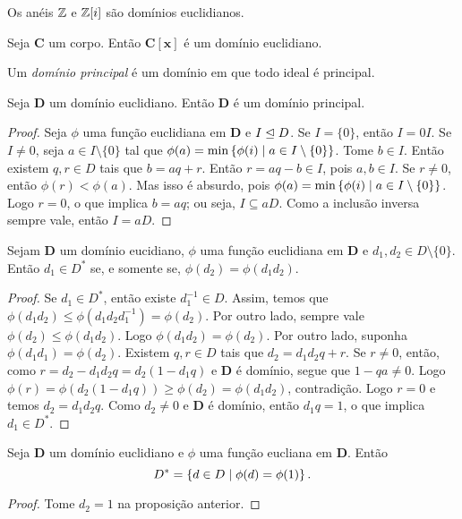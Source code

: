 \begin{prop}
Os anéis $\mathbb{Z}$ e $\mathbb{Z}[i]$ são domínios euclidianos.
\end{prop}

\begin{prop}
Seja $\bm C$ um corpo. Então $\bm{C[x]}$ é um domínio euclidiano.
\end{prop}

\begin{defi}
Um \emph{domínio principal} é um domínio em que todo ideal é principal.
\end{defi}

\begin{prop}
 Seja $\bm D$ um domínio euclidiano. Então $\bm D$ é um domínio principal.
\end{prop}
\begin{proof}
Seja $\phi$ uma função euclidiana em $\bm D$ e $I \mathrel{\unlhd} D$. Se $I = \{0\}$, então $I = 0I$. Se $I \neq 0$, seja $a \in I \setminus \{0\}$ tal que $\phi(a) = \min\left\{\phi(i) \;\middle\vert\; a \in I \setminus \{0\} \right\}$. Tome $b \in I$. Então existem $q,r \in D$ tais que $b=aq+r$. Então $r = aq-b \in I$, pois $a,b \in I$. Se $r \neq 0$, então $\phi(r) < \phi(a)$. Mas isso é absurdo, pois $\phi(a) = \min\left\{\phi(i) \;\middle\vert\; a \in I \setminus \{0\} \right\}$. Logo $r=0$, o que implica $b=aq$; ou seja, $I \subseteq aD$. Como a inclusão inversa sempre vale, então $I=aD$.
\end{proof}

\begin{prop}
Sejam $\bm D$ um domínio eucidiano, $\phi$ uma função euclidiana em $\bm D$ e $d_1,d_2 \in D \setminus \{0\}$. Então $d_1 \in D^*$ se, e somente se, $\phi(d_2) = \phi(d_1d_2)$.
\end{prop}
\begin{proof}
	Se $d_1 \in D^*$, então existe $d_1^{-1} \in D$. Assim, temos que $\phi(d_1d_2) \leq \phi(d_1d_2d_1^{-1})=\phi(d_2)$. Por outro lado, sempre vale $\phi(d_2) \leq \phi(d_1d_2)$. Logo $\phi(d_1d_2)=\phi(d_2)$. Por outro lado, suponha $\phi(d_1d_1)=\phi(d_2)$. Existem $q,r \in D$ tais que $d_2 = d_1d_2q+r$. Se $r \neq 0$, então, como $r = d_2-d_1d_2q = d_2(1-d_1q)$ e $\bm D$ é domínio, segue que $1-qa \neq 0$. Logo $\phi(r)=\phi(d_2(1-d_1q)) \geq \phi(d_2) = \phi(d_1d_2)$, contradição. Logo $r=0$ e temos $d_2=d_1d_2q$. Como $d_2 \neq 0$ e $\bm D$ é domínio, então $d_1q = 1$, o que implica $d_1 \in D^*$.
\end{proof}

\begin{prop}
	Seja $\bm D$ um domínio euclidiano e $\phi$ uma função eucliana em $\bm D$. Então
	\begin{equation*}
	D^* = \left\{d \in D \;\middle\vert\; \phi(d)=\phi(1) \right\}.
	\end{equation*}
\end{prop}
\begin{proof}
	Tome $d_2=1$ na proposição anterior.
\end{proof}





